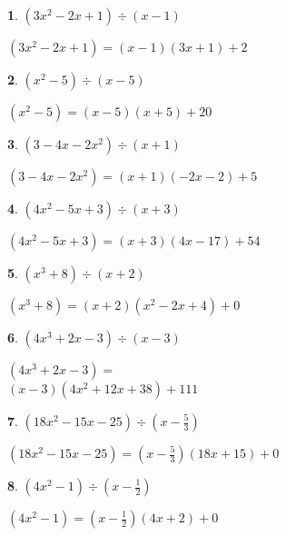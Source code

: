 \documentclass{amsbook}
\newtheorem{exc}{}
\newenvironment{ex}{\begin{exc}\normalfont}{\end{exc}}
\numberwithin{section}{chapter}
\numberwithin{equation}{chapter}
\begin{document}
\begin{multicols}{2}
\begin{ex}
	 $\left(3x^2-2x+1 \right) \div \left(x-1\right)$ 
	\begin{sol}
		$\left(3x^2-2x+1 \right) = \left(x-1\right) (3x+1)+2$
	\end{sol}
\end{ex}

\begin{ex}
	 $\left(x^2-5 \right) \div \left(x-5\right)$
	\begin{sol}
		$\left(x^2-5 \right)= \left(x-5\right)(x+5) + 20$
	\end{sol}
\end{ex}

\begin{ex}
	$\left(3-4x-2x^2 \right) \div \left(x+1\right)$
	\begin{sol}
		 $\left(3-4x-2x^2 \right) = \left(x+1\right)(-2x-2)+5$
	\end{sol}
\end{ex}

\begin{ex}
	$\left(4x^2-5x +3\right) \div \left(x+3\right)$
	\begin{sol}
		$\left(4x^2-5x +3\right) = \left(x+3\right)(4x-17)+54$
	\end{sol}
\end{ex}
	
\begin{ex}
	 $\left(x^3 + 8 \right) \div \left(x+2\right)$
	\begin{sol}
		 $\left(x^3 + 8 \right) = \left(x+2\right) \left(x^2-2x+4\right) + 0$
	\end{sol}
\end{ex}

\begin{ex}
	 $\left(4x^3 +2x-3 \right) \div \left(x -3\right)$
	\begin{sol}
		$\left(4x^3 +2x-3 \right) = $\\
$\left(x -3\right) \left(4x^2+12x+38\right) + 111$
	\end{sol}
\end{ex}

\begin{ex}
	$\left(18x^2-15x-25\right) \div \left(x - \frac{5}{3} \right)$
	\begin{sol}
		$\left(18x^2-15x-25\right) = \left(x - \frac{5}{3} \right)(18x+15)+0$
	\end{sol}
\end{ex}

\begin{ex}
	$\left(4x^2-1 \right) \div \left(x - \frac{1}{2} \right)$
	\begin{sol}
		$\left(4x^2-1 \right) = \left(x - \frac{1}{2} \right)(4x+2)+0$
	\end{sol}
\end{ex}
	

\end{multicols}
\end{document}
